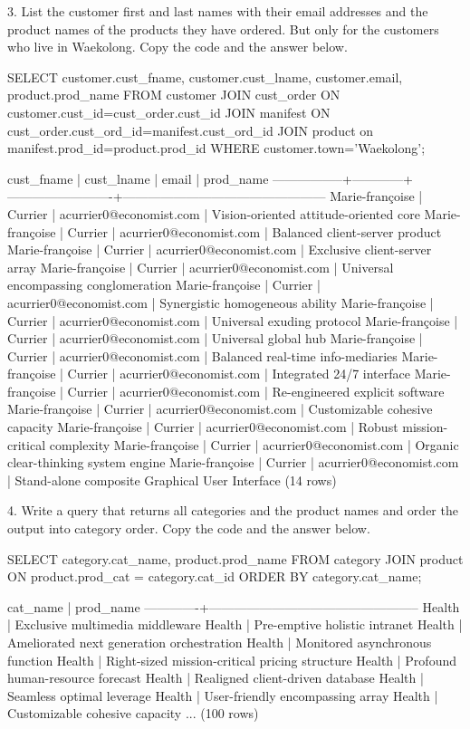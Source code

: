 3. List the customer first and last names with their email addresses and the product names of the products they have ordered. But only for the customers who live in Waekolong. Copy the code and the answer below.
\begin{sql}
SELECT customer.cust_fname, customer.cust_lname, customer.email, product.prod_name FROM customer
JOIN cust_order ON customer.cust_id=cust_order.cust_id
JOIN manifest ON cust_order.cust_ord_id=manifest.cust_ord_id
JOIN product on manifest.prod_id=product.prod_id
WHERE customer.town='Waekolong';
\end{sql}
\begin{pseudo*}
   cust_fname    | cust_lname |          email          |                   prod_name
-----------------+------------+-------------------------+------------------------------------------------        
 Marie-françoise | Currier    | acurrier0@economist.com | Vision-oriented attitude-oriented core
 Marie-françoise | Currier    | acurrier0@economist.com | Balanced client-server product
 Marie-françoise | Currier    | acurrier0@economist.com | Exclusive client-server array
 Marie-françoise | Currier    | acurrier0@economist.com | Universal encompassing conglomeration
 Marie-françoise | Currier    | acurrier0@economist.com | Synergistic homogeneous ability
 Marie-françoise | Currier    | acurrier0@economist.com | Universal exuding protocol
 Marie-françoise | Currier    | acurrier0@economist.com | Universal global hub
 Marie-françoise | Currier    | acurrier0@economist.com | Balanced real-time info-mediaries
 Marie-françoise | Currier    | acurrier0@economist.com | Integrated 24/7 interface
 Marie-françoise | Currier    | acurrier0@economist.com | Re-engineered explicit software
 Marie-françoise | Currier    | acurrier0@economist.com | Customizable cohesive capacity
 Marie-françoise | Currier    | acurrier0@economist.com | Robust mission-critical complexity
 Marie-françoise | Currier    | acurrier0@economist.com | Organic clear-thinking system engine
 Marie-françoise | Currier    | acurrier0@economist.com | Stand-alone composite Graphical User Interface
(14 rows)
\end{pseudo*}

4. Write a query that returns all categories and the product names and order the output into category order. Copy the code and the answer below.
\begin{sql}
SELECT category.cat_name, product.prod_name FROM category
JOIN product ON product.prod_cat = category.cat_id
ORDER BY category.cat_name;
\end{sql}
\begin{pseudo*}
  cat_name   |                    prod_name
-------------+--------------------------------------------------
 Health      | Exclusive multimedia middleware
 Health      | Pre-emptive holistic intranet
 Health      | Ameliorated next generation orchestration
 Health      | Monitored asynchronous function
 Health      | Right-sized mission-critical pricing structure
 Health      | Profound human-resource forecast
 Health      | Realigned client-driven database
 Health      | Seamless optimal leverage
 Health      | User-friendly encompassing array
 Health      | Customizable cohesive capacity
...
(100 rows)
\end{pseudo*}

